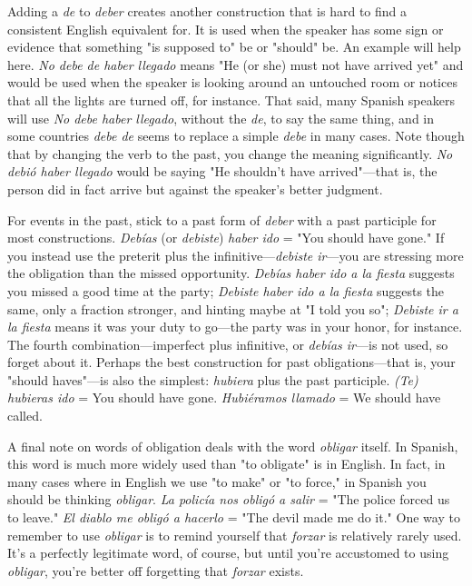 Adding a \emph{de} to \emph{deber} creates another construction that is
hard to find a consistent English equivalent for. It is used when the
speaker has some sign or evidence that something "is supposed to"
be or "should" be. An example will help here. \emph{No debe de haber llegado} means "He (or she) must not have arrived yet" and would be used
when the speaker is looking around an untouched room or notices that
all the lights are turned off, for instance. That said, many Spanish speakers will use \emph{No debe haber llegado}, without the \emph{de}, to say the
same thing, and in some countries \emph{debe de} seems to replace a simple
\emph{debe} in many cases. Note though that by changing the verb to the
past, you change the meaning significantly. \emph{No debió haber llegado}
would be saying "He shouldn't have arrived"---that is, the person did
in fact arrive but against the speaker's better judgment.

For events in the past, stick to a past form of \emph{deber} with a past
participle for most constructions. \emph{Debías} (or \emph{debiste}) \emph{haber ido} =
"You should have gone." If you instead use the preterit plus the infinitive---\emph{debiste ir}---you are stressing more the obligation than the
missed opportunity. \emph{Debías haber ido a la fiesta} suggests you missed a
good time at the party; \emph{Debiste haber ido a la fiesta} suggests the same,
only a fraction stronger, and hinting maybe at "I told you so"; \emph{Debiste
ir a la fiesta} means it was your duty to go---the party was in your
honor, for instance. The fourth combination---imperfect plus infinitive, or \emph{debías ir}---is not used, so forget about it. Perhaps the best construction for past obligations---that is, your "should haves"---is also
the simplest: \emph{hubiera} plus the past participle. \emph{(Te) hubieras ido} = You
should have gone. \emph{Hubiéramos llamado} = We should have called.

A final note on words of obligation deals with the word \emph{obligar} itself. In Spanish, this word is much more widely used than "to
obligate" is in English. In fact, in many cases where in English we use
"to make" or "to force," in Spanish you should be thinking \emph{obligar}. \emph{La
policía nos obligó a salir} = "The police forced us to leave." \emph{El diablo
me obligó a hacerlo} = "The devil made me do it." One way to remember to use \emph{obligar} is to remind yourself that \emph{forzar} is relatively rarely
used. It's a perfectly legitimate word, of course, but until you're accustomed to using \emph{obligar}, you're better off forgetting that \emph{forzar} exists.

